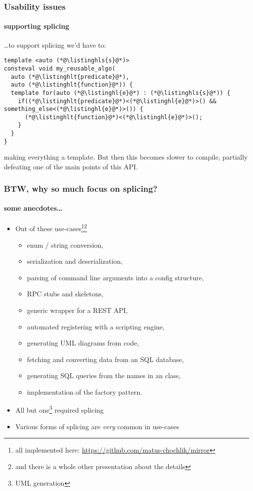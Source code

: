\documentclass[compress,table,xcolor=table]{beamer}
\begin{document}
\begin{frame}[fragile]
  \frametitle{Usability issues}
  \framesubtitle{supporting splicing}
  \ldots to support splicing we'd have to:
  \begin{lstlisting}[language=c++2x,basicstyle=\small\ttfamily]
template <auto (*@\listinghls{s}@*)>
consteval void my_reusable_algo(
  auto (*@\listinghlt{predicate}@*),
  auto (*@\listinghlt{function}@*)) {
  template for(auto (*@\listinghl{e}@*) : (*@\listinghls{s}@*)) {
    if((*@\listinghlt{predicate}@*)<(*@\listinghl{e}@*)>() && something_else<(*@\listinghl{e}@*)>()) {
      (*@\listinghlt{function}@*)<(*@\listinghl{e}@*)>();
    }
  }
}
  \end{lstlisting}
  making everything a template. But then this becomes slower to compile,
  partially defeating one of the main points of this API.
\end{frame}
\begin{frame}
  \frametitle{BTW, why so much focus on splicing?}
  \framesubtitle{some anecdotes\ldots}
  \begin{itemize}
  \item Out of these use-cases\footnote{all implemented here:
    \url{https://github.com/matus-chochlik/mirror}}\footnote{
      and there is a whole other presentation about the details}
    \begin{itemize}
      \smaller
      \item enum / string conversion,
      \item serialization and deserialization,
      \item parsing of command line arguments into a config structure,
      \item RPC stubs and skeletons,
      \item generic wrapper for a REST API,
      \item automated registering with a scripting engine,
      \item generating UML diagrams from code,
      \item fetching and converting data from an SQL database,
      \item generating SQL queries from the names in an  class,
      \item implementation of the factory pattern.
    \end{itemize}
  \item All but one\footnote{UML generation} required splicing
  \item Various forms of splicing are {\em \larger very} common in use-cases
  \end{itemize}
\end{frame}
\end{document}
